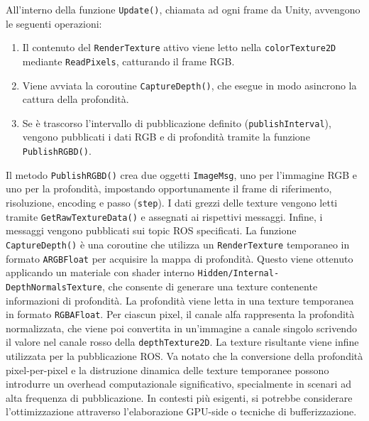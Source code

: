 \documentclass[11pt]{report}
\begin{document}
All'interno della funzione \texttt{Update()}, chiamata ad ogni frame da Unity, avvengono le seguenti operazioni:
\begin{enumerate}
  \item Il contenuto del \texttt{RenderTexture} attivo viene letto nella \texttt{colorTexture2D} mediante \texttt{ReadPixels}, catturando il frame RGB.
  \item Viene avviata la coroutine \texttt{CaptureDepth()}, che esegue in modo asincrono la cattura della profondità.
  \item Se è trascorso l'intervallo di pubblicazione definito (\texttt{publishInterval}), vengono pubblicati i dati RGB e di profondità tramite la funzione \texttt{PublishRGBD()}.
\end{enumerate}

Il metodo \texttt{PublishRGBD()} crea due oggetti \texttt{ImageMsg}, uno per l’immagine RGB e uno per la profondità, impostando opportunamente il frame di riferimento, risoluzione, encoding e passo (\texttt{step}). I dati grezzi delle texture vengono letti tramite \texttt{GetRawTextureData()} e assegnati ai rispettivi messaggi. Infine, i messaggi vengono pubblicati sui topic ROS specificati.
\newline
La funzione \texttt{CaptureDepth()} è una coroutine che utilizza un \texttt{RenderTexture} temporaneo in formato \texttt{ARGBFloat} per acquisire la mappa di profondità. Questo viene ottenuto applicando un materiale con shader interno \texttt{Hidden/Internal-DepthNormalsTexture}, che consente di generare una texture contenente informazioni di profondità.
\newline
La profondità viene letta in una texture temporanea in formato \texttt{RGBAFloat}. Per ciascun pixel, il canale alfa rappresenta la profondità normalizzata, che viene poi convertita in un'immagine a canale singolo scrivendo il valore nel canale rosso della \texttt{depthTexture2D}. La texture risultante viene infine utilizzata per la pubblicazione ROS.
\newline
Va notato che la conversione della profondità pixel-per-pixel e la distruzione dinamica delle texture temporanee possono introdurre un overhead computazionale significativo, specialmente in scenari ad alta frequenza di pubblicazione. In contesti più esigenti, si potrebbe considerare l'ottimizzazione attraverso l'elaborazione GPU-side o tecniche di bufferizzazione.

\end{document}
